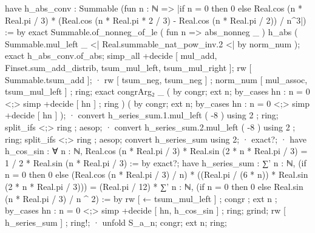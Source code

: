         have h_abs_conv : Summable (fun n : ℕ => |if n = 0 then 0 else Real.cos (n * Real.pi / 3) * (Real.cos (n * Real.pi * 2 / 3) - Real.cos (n * Real.pi / 2)) / n^3|) := by
          exact Summable.of_nonneg_of_le ( fun n => abs_nonneg _ ) h_abs ( Summable.mul_left _ <| Real.summable_nat_pow_inv.2 <| by norm_num );
        exact h_abs_conv.of_abs;
    simp_all +decide [ mul_add, Finset.sum_add_distrib, tsum_mul_left, tsum_mul_right ];
    rw [ Summable.tsum_add ];
    · rw [ tsum_neg, tsum_neg ] ; norm_num [ mul_assoc, tsum_mul_left ] ; ring;
      exact congrArg₂ _ ( by congr; ext n; by_cases hn : n = 0 <;> simp +decide [ hn ] ; ring ) ( by congr; ext n; by_cases hn : n = 0 <;> simp +decide [ hn ] );
    · convert h_series_sum.1.mul_left ( -8 ) using 2 ; ring;
      split_ifs <;> ring ; aesop;
    · convert h_series_sum.2.mul_left ( -8 ) using 2 ; ring;
      split_ifs <;> ring ; aesop;
  convert h_series_sum using 2;
  · exact?;
  · have h_cos_sin : ∀ n : ℕ, Real.cos (n * Real.pi / 3) * Real.sin (2 * n * Real.pi / 3) = 1 / 2 * Real.sin (n * Real.pi / 3) := by
      exact?;
    have h_series_sum : ∑' n : ℕ, (if n = 0 then 0 else (Real.cos (n * Real.pi / 3) / n) * ((Real.pi / (6 * n)) * Real.sin (2 * n * Real.pi / 3))) = (Real.pi / 12) * ∑' n : ℕ, (if n = 0 then 0 else Real.sin (n * Real.pi / 3) / n ^ 2) := by
      rw [ ← tsum_mul_left ] ; congr ; ext n ; by_cases hn : n = 0 <;> simp +decide [ hn, h_cos_sin ] ; ring;
      grind;
    rw [ h_series_sum ] ; ring!;
  · unfold S_a_n; congr; ext n; ring;

